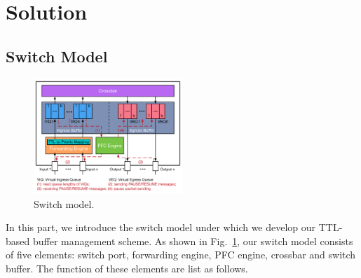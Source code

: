 \section{Solution}\label{sec:sol}

\subsection{Switch Model}\label{subsec:model}

\begin{figure}
	\centering
		\includegraphics[width=0.5\textwidth] {figs/switch_model}
	\caption{Switch model.}\label{fig:switchmodel}

\end{figure}

In this part, we introduce the switch model under which we develop our TTL-based buffer management scheme. As shown in Fig.~\ref{fig:switchmodel},
our switch model consists of five elements: switch port, forwarding engine, PFC engine, crossbar and switch buffer. The function of these elements are list as follows.


